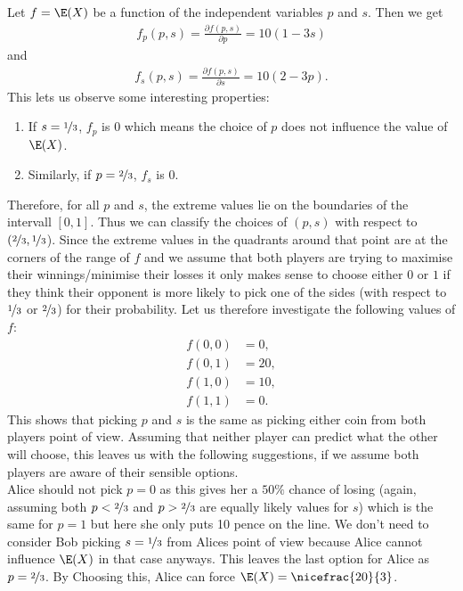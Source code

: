 \documentclass{article}
\begin{document}
Let $f=\E(X)$ be a function of the independent variables $p$ and $s$.
Then we get
\begin{align*}
  f_p(p,s)=\frac{\partial f(p,s)}{\partial p} = 10(1-3s)
\end{align*}
and
\begin{align*}
  f_s(p,s)=\frac{\partial f(p,s)}{\partial s} = 10(2-3p).
\end{align*}
This lets us observe some interesting properties:
\begin{enumerate}
  \item If $s=\nicefrac{1}{3}$, $f_p$ is $0$ which means the choice of
        $p$ does not influence the value of $\E(X)$.
  \item Similarly, if $p=\nicefrac{2}{3}$, $f_s$ is $0$.
\end{enumerate}
Therefore, for all $p$ and $s$, the extreme values lie on the boundaries
of the intervall $[0,1]$. Thus we can classify the choices of $(p,s)$ with
respect to $(\nicefrac{2}{3}, \nicefrac{1}{3}$). Since the extreme values
in the quadrants around that point are at the corners of the range of
$f$ and we assume that both players are trying to maximise their
winnings/minimise their losses it only makes sense to choose either
$0$ or $1$ if they think their opponent is more likely to pick one of the
sides (with respect to $\nicefrac{1}{3}$ or $\nicefrac{2}{3}$) for their
probability. Let us therefore investigate the following values of $f$:
\begin{align*}
  f(0,0) & =0,  \\
  f(0,1) & =20, \\
  f(1,0) & =10, \\
  f(1,1) & =0.
\end{align*}
This shows that picking $p$ and $s$ is the same as picking either
coin from both players point of view. Assuming that neither player
can predict what the other will choose, this leaves us with the following
suggestions, if we assume both players are aware of their sensible options.\\
Alice should not pick $p=0$ as this gives her a $50\%$ chance of losing
(again, assuming both $p<\nicefrac{2}{3}$ and $p>\nicefrac{2}{3}$
are equally likely values for $s$)
which is the same for $p=1$ but here she only puts 10 pence on the line.
We don't need to consider Bob picking $s=\nicefrac{1}{3}$ from Alices
point of view because Alice cannot influence $\E(X)$ in that case anyways.
This leaves the last option for Alice as $p=\nicefrac{2}{3}$.
By Choosing this, Alice can force $\E(X)=\nicefrac{20}{3}$.
\end{document}
